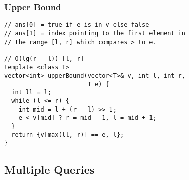 \documentclass[twoside]{article}
\newcommand{\fileTitleStyle}{\large\underline}
\begin{document}
\begin{multicols*}{2}
\subsubsectionfont{\centering\bfseries\Large}
\subsubsectionfont{\fileTitleStyle}
\subsubsection*{Upper Bound}
\begin{verbatim}
// ans[0] = true if e is in v else false
// ans[1] = index pointing to the first element in
// the range [l, r] which compares > to e.

// O(lg(r - l)) [l, r]
template <class T>
vector<int> upperBound(vector<T>& v, int l, int r,
                       T e) {
  int ll = l;
  while (l <= r) {
    int mid = l + (r - l) >> 1;
    e < v[mid] ? r = mid - 1, l = mid + 1;
  }
  return {v[max(ll, r)] == e, l};
}
\end{verbatim}

\subsectionfont{\centering\bfseries\LARGE}
\vspace{0em}
\subsection*{Multiple Queries}
\vspace{2em}
\subsubsectionfont{\centering\bfseries\Large}
\subsubsectionfont{\fileTitleStyle}

\end{multicols*}
\end{document}
